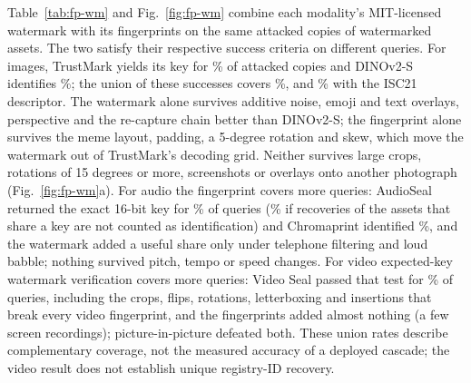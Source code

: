 Table~\ref{tab:fp-wm} and Fig.~\ref{fig:fp-wm} combine each modality's MIT-licensed watermark with its fingerprints on the same attacked copies of watermarked assets. The two satisfy their respective success criteria on different queries. For images, TrustMark yields its key for \% of attacked copies and DINOv2-S identifies \%; the union of these successes covers \%, and \% with the ISC21 descriptor. The watermark alone survives additive noise, emoji and text overlays, perspective and the re-capture chain better than DINOv2-S; the fingerprint alone survives the meme layout, padding, a 5-degree rotation and skew, which move the watermark out of TrustMark's decoding grid. Neither survives large crops, rotations of 15 degrees or more, screenshots or overlays onto another photograph (Fig.~\ref{fig:fp-wm}a). For audio the fingerprint covers more queries: AudioSeal returned the exact 16-bit key for \% of queries (\% if recoveries of the  assets that share a key are not counted as identification) and Chromaprint identified \%, and the watermark added a useful share only under telephone filtering and loud babble; nothing survived pitch, tempo or speed changes. For video expected-key watermark verification covers more queries: Video Seal passed that test for \% of queries, including the crops, flips, rotations, letterboxing and insertions that break every video fingerprint, and the fingerprints added almost nothing (a few screen recordings); picture-in-picture defeated both. These union rates describe complementary coverage, not the measured accuracy of a deployed cascade; the video result does not establish unique registry-ID recovery.

